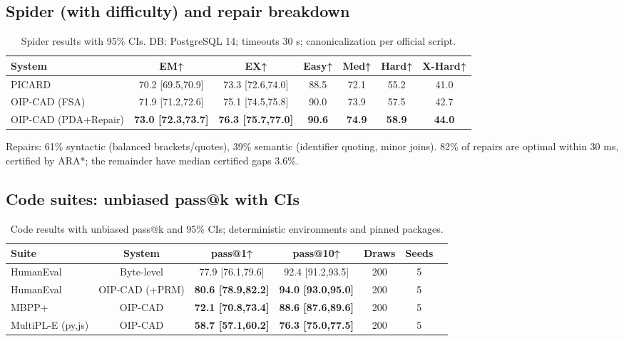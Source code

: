 \documentclass{article}
\begin{document}
\subsection{Spider (with difficulty) and repair breakdown}
\begin{table}[H]
\centering
\small
\begin{tabular}{@{}lcccccc@{}}
\toprule
System & EM↑ & EX↑ & Easy↑ & Med↑ & Hard↑ & X-Hard↑ \\
\midrule
PICARD & 70.2 [69.5,70.9] & 73.3 [72.6,74.0] & 88.5 & 72.1 & 55.2 & 41.0 \\
OIP-CAD (FSA) & 71.9 [71.2,72.6] & 75.1 [74.5,75.8] & 90.0 & 73.9 & 57.5 & 42.7 \\
OIP-CAD (PDA+Repair) & \textbf{73.0 [72.3,73.7]} & \textbf{76.3 [75.7,77.0]} & \textbf{90.6} & \textbf{74.9} & \textbf{58.9} & \textbf{44.0} \\
\bottomrule
\end{tabular}
\caption{Spider results with 95\% CIs. DB: PostgreSQL 14; timeouts 30 s; canonicalization per official script.}
\end{table}
Repairs: 61\% syntactic (balanced brackets/quotes), 39\% semantic (identifier quoting, minor joins). 82\% of repairs are optimal within 30 ms, certified by ARA*; the remainder have median certified gaps 3.6\%.

\subsection{Code suites: unbiased pass@k with CIs}
\begin{table}[H]
\centering
\small
\begin{tabular}{@{}lcccccc@{}}
\toprule
Suite & System & pass@1↑ & pass@10↑ & Draws & Seeds \\
\midrule
HumanEval & Byte-level & 77.9 [76.1,79.6] & 92.4 [91.2,93.5] & 200 & 5 \\
HumanEval & OIP-CAD (+PRM) & \textbf{80.6 [78.9,82.2]} & \textbf{94.0 [93.0,95.0]} & 200 & 5 \\
MBPP+ & OIP-CAD & \textbf{72.1 [70.8,73.4]} & \textbf{88.6 [87.6,89.6]} & 200 & 5 \\
MultiPL-E (py,js) & OIP-CAD & \textbf{58.7 [57.1,60.2]} & \textbf{76.3 [75.0,77.5]} & 200 & 5 \\
\bottomrule
\end{tabular}
\caption{Code results with unbiased pass@k and 95\% CIs; deterministic environments and pinned packages.}
\end{table}
\end{document}
